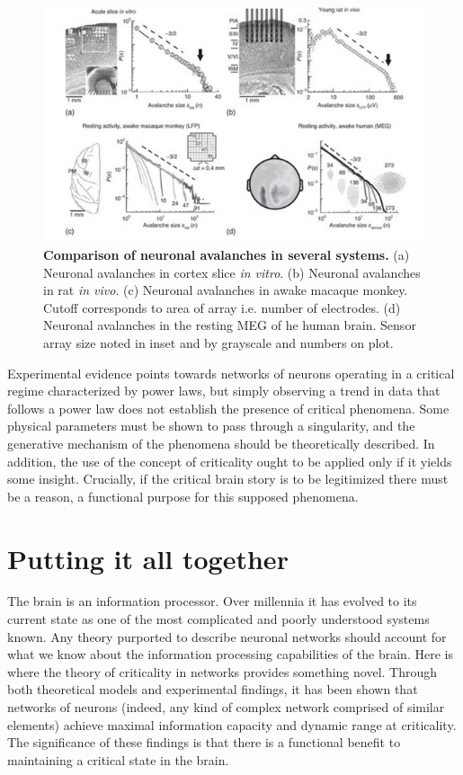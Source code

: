 \documentclass[12pt]{article}
\begin{document}
\begin{figure}      
  \begin{center}    
 \includegraphics[width=.9\textwidth]{avalanchesplenzbook}    
    \caption{\textbf{Comparison of neuronal avalanches in several systems.} (a) Neuronal avalanches in cortex slice \textit{in vitro}. (b) Neuronal avalanches in rat \textit{in vivo}. (c) Neuronal avalanches in awake macaque monkey. Cutoff corresponds to area of array i.e. number of electrodes. (d) Neuronal avalanches in the resting MEG of he human brain. Sensor array size noted in inset and by grayscale and numbers on plot. \cite{Plenz2014}}
   \label{Figure::Neuronal avalanches in vitro and in vivo}   
  \end{center}     
   \end{figure}

Experimental evidence points towards networks of neurons operating in a critical regime characterized by power laws, but simply observing a trend in data that follows a power law does not establish the presence of critical phenomena. Some physical parameters must be shown to pass through a singularity, and the generative mechanism of the phenomena should be theoretically described. In addition, the use of the concept of criticality ought to be applied only if it yields some insight. Crucially, if the critical brain story is to be legitimized there must be a reason, a functional purpose for this supposed phenomena.   
      
\section*{Putting it all together}

The brain is an information processor. Over millennia it has evolved to its current state as one of the most complicated and poorly understood systems known. Any theory purported to describe neuronal networks should account for what we know about the information processing capabilities of the brain. Here is where the theory of criticality in networks provides something novel. Through both theoretical models and experimental findings, it has been shown that networks of neurons (indeed, any kind of complex network comprised of similar elements) achieve maximal information capacity and dynamic range at criticality. The significance of these findings is that there is a functional benefit to maintaining a critical state in the brain.
\end{document}
